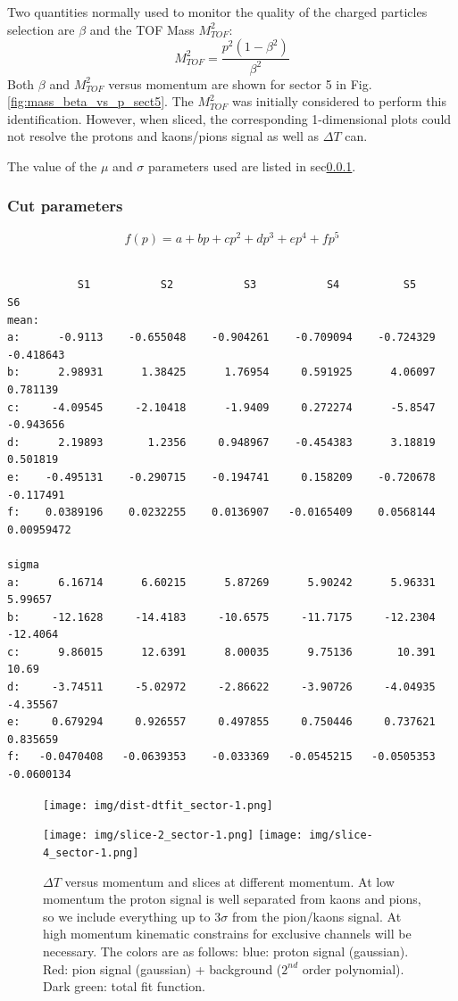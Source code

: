 Two quantities normally used to monitor the quality of the charged particles
selection are $\beta$ and the TOF Mass $M_{TOF}^2$:
$$
 M_{TOF}^2 = \frac{p^2(1-\beta^2)}{\beta^2}
$$
Both $\beta$ and $M_{TOF}^2$ versus momentum are shown for sector 5 in 
Fig.\ref{fig:mass_beta_vs_p_sect5}. The $M_{TOF}^2$ was initially considered
to perform this identification. However, when sliced, the corresponding
1-dimensional plots could not resolve the protons and kaons/pions signal 
as well as $\Delta T$ can.

The value of the $\mu$ and $\sigma$ parameters used are listed in sec\ref{sec:dtp_parameters}.




\subsubsection{Cut parameters}\label{sec:dtp_parameters}
$$
f(p) = a + bp + cp^2 + dp^3 + ep^4 + fp^5
$$
\begin{verbatim}

           S1           S2           S3           S4          S5            S6
mean:
a:      -0.9113    -0.655048    -0.904261    -0.709094    -0.724329    -0.418643
b:      2.98931      1.38425      1.76954     0.591925      4.06097     0.781139
c:     -4.09545     -2.10418      -1.9409     0.272274      -5.8547    -0.943656
d:      2.19893       1.2356     0.948967    -0.454383      3.18819     0.501819
e:    -0.495131    -0.290715    -0.194741     0.158209    -0.720678    -0.117491
f:    0.0389196    0.0232255    0.0136907   -0.0165409    0.0568144   0.00959472

sigma 
a:      6.16714      6.60215      5.87269      5.90242      5.96331      5.99657
b:     -12.1628     -14.4183     -10.6575     -11.7175     -12.2304     -12.4064
c:      9.86015      12.6391      8.00035      9.75136       10.391        10.69
d:     -3.74511     -5.02972     -2.86622     -3.90726     -4.04935     -4.35567
e:     0.679294     0.926557     0.497855     0.750446     0.737621     0.835659
f:   -0.0470408   -0.0639353    -0.033369   -0.0545215   -0.0505353   -0.0600134

\end{verbatim}

\clearpage\newpage

\begin{figure}[ht]
  \centering
		\texttt{[image: img/dist-dtfit\_sector-1.png]}
		
		\texttt{[image: img/slice-2\_sector-1.png]}
		\texttt{[image: img/slice-4\_sector-1.png]}
		
		\caption{$\Delta T$ versus momentum and slices at different momentum.
					At low momentum the proton signal is well separated
					from kaons and pions, so we include everything up to
					$3\sigma$ from the pion/kaons signal. At high momentum 
					kinematic constrains for exclusive channels will be necessary.
					The colors are as follows: blue: proton signal (gaussian).
					Red: pion signal (gaussian) + background ($2^{nd}$ order 
					polynomial). Dark green: total fit function.}
 		\label{fig:dt_vs_mom}
\end{figure}

